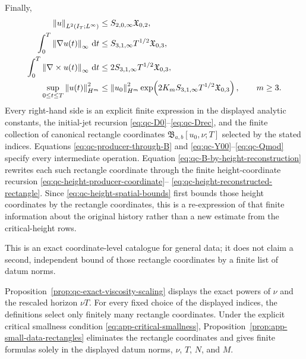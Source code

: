 {\begin{theorem}
Finally,
\begin{align}
 \left\lVert u\right\rVert_{L^2(I_T;L^\infty)}
 &\le S_{2,0,\infty}\mathfrak X_{0,2},
 \label{eq:qc-sharp-L2Linfty}\\
 \int_0^T\left\lVert \nabla u(t)\right\rVert_\infty\,\mathrm d t
 &\le S_{3,1,\infty}T^{1/2}\mathfrak X_{0,3},
 \label{eq:qc-sharp-lipschitz-action}\\
 \int_0^T\left\lVert \nabla\times u(t)\right\rVert_\infty\,\mathrm d t
 &\le2S_{3,1,\infty}T^{1/2}\mathfrak X_{0,3},
 \label{eq:qc-sharp-vorticity-action}\\
 \sup_{0\le t\le T}\left\lVert u(t)\right\rVert_{H^m}^2
 &\le\left\lVert u_0\right\rVert_{H^m}^2
 \exp\!\left(
 2K_mS_{3,1,\infty}T^{1/2}\mathfrak X_{0,3}
 \right),
 \qquad m\ge3.
 \label{eq:qc-sharp-continuation-growth}
\end{align}
Every right-hand side is an explicit finite expression in the displayed
analytic constants, the initial-jet recursion
\eqref{eq:qc-D0}--\eqref{eq:qc-Drec}, and the finite collection of canonical
rectangle coordinates \(\mathfrak B_{a,b}[u_0,\nu;T]\) selected by the stated
indices.  Equations \eqref{eq:qc-producer-through-B} and
\eqref{eq:qc-Y00}--\eqref{eq:qc-Qmod} specify every intermediate operation.
Equation \eqref{eq:qc-B-by-height-reconstruction} rewrites each such rectangle
coordinate through the finite height-coordinate recursion
\eqref{eq:qc-height-producer-coordinate}--%
\eqref{eq:qc-height-reconstructed-rectangle}.  Since
\eqref{eq:qc-height-spatial-bounds} first bounds those height coordinates by
the rectangle coordinates, this is a re-expression of that finite information about the original history rather than a new estimate from the critical-height
rows.
\begin{samepage}
This is an exact coordinate-level
catalogue for general data; it does not claim a second, independent bound of
those rectangle coordinates by a finite list of datum norms.\par
\end{samepage}
Proposition~\ref{prop:qc-exact-viscosity-scaling} displays the exact powers of
\(\nu\) and the rescaled horizon \(\nu T\).  For every fixed choice of the
displayed indices, the definitions select only finitely many rectangle
coordinates.
Under the explicit critical smallness condition
\eqref{eq:app-critical-smallness}, Proposition~\ref{prop:app-small-data-rectangles}
eliminates the rectangle coordinates and gives finite formulas solely in the
displayed datum norms, \(\nu\), \(T\), \(N\), and \(M\).
\end{theorem}

}
